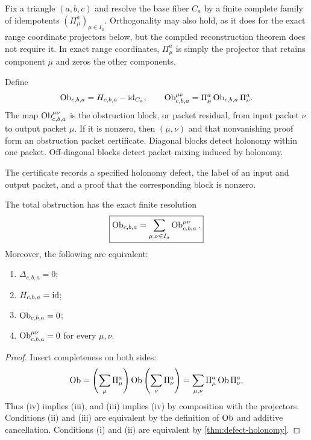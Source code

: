 Fix a triangle $(a,b,c)$ and resolve the base fiber $C_a$ by a finite complete
family of idempotents $(\Pi^a_\mu)_{\mu\in I_a}$.  Orthogonality may also hold,
as it does for the exact range coordinate projectors below, but the compiled
reconstruction theorem does not require it.  In exact range coordinates,
$\Pi^a_\mu$ is simply the projector that retains component $\mu$ and zeros
the other components.

\begin{definition}
\label{def:obstruction-packet}
Define
\[
\operatorname{Ob}_{c,b,a}=H_{c,b,a}-\mathrm{id}_{C_a},
\qquad
\operatorname{Ob}^{\mu\nu}_{c,b,a}
=
\Pi^a_\mu\operatorname{Ob}_{c,b,a}\Pi^a_\nu.
\]
The map $\operatorname{Ob}^{\mu\nu}_{c,b,a}$ is the obstruction block, or packet residual,
from input packet $\nu$ to output packet $\mu$.  If it is nonzero, then
$(\mu,\nu)$ and that nonvanishing proof form an obstruction packet
certificate.  Diagonal blocks detect holonomy within one packet.  Off-diagonal
blocks detect packet mixing induced by holonomy.
\end{definition}

The certificate records a specified holonomy defect, the label of an input
and output packet, and a proof that the corresponding block is nonzero.

\begin{theorem}
\label{thm:obstruction-detection}
The total obstruction has the exact finite resolution
\[
\boxed{
\operatorname{Ob}_{c,b,a}
=
\sum_{\mu,\nu\in I_a}
\operatorname{Ob}^{\mu\nu}_{c,b,a}.
}
\]
Moreover, the following are equivalent:
\begin{enumerate}[label=(\roman*)]
\item $\Delta_{c,b,a}=0$;
\item $H_{c,b,a}=\mathrm{id}$;
\item $\operatorname{Ob}_{c,b,a}=0$;
\item $\operatorname{Ob}^{\mu\nu}_{c,b,a}=0$ for every $\mu,\nu$.
\end{enumerate}
\end{theorem}

\begin{proof}
Insert completeness on both sides:
\[
\operatorname{Ob}
=
\left(\sum_\mu\Pi^a_\mu\right)
\operatorname{Ob}
\left(\sum_\nu\Pi^a_\nu\right)
=
\sum_{\mu,\nu}\Pi^a_\mu\operatorname{Ob}\Pi^a_\nu.
\]
Thus (iv) implies (iii), and (iii) implies (iv) by composition with the
projectors.  Conditions (ii) and (iii) are equivalent by the definition of
$\operatorname{Ob}$ and additive cancellation.
Conditions (i) and (ii) are equivalent by
\cref{thm:defect-holonomy}.
\end{proof}

